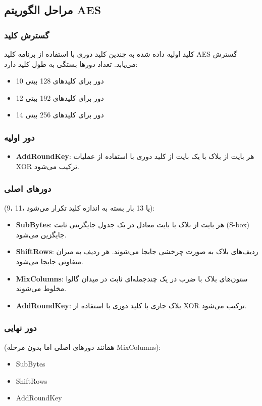 \documentclass[11pt]{article}
\begin{document}
\subsection*{مراحل الگوریتم AES}

\subsubsection*{گسترش کلید}
کلید اولیه داده شده به چندین کلید دوری با استفاده از برنامه کلید AES گسترش می‌یابد. تعداد دورها بستگی به طول کلید دارد:
\begin{itemize}
    \item 10 دور برای کلیدهای 128 بیتی
    \item 12 دور برای کلیدهای 192 بیتی
    \item 14 دور برای کلیدهای 256 بیتی
\end{itemize}

\subsubsection*{دور اولیه}
\begin{itemize}
    \item \textbf{AddRoundKey}: هر بایت از بلاک با یک بایت از کلید دوری با استفاده از عملیات XOR ترکیب می‌شود.
\end{itemize}

\subsubsection*{دورهای اصلی}
(9، 11، یا 13 بار بسته به اندازه کلید تکرار می‌شود):
\begin{itemize}
    \item \textbf{SubBytes}: هر بایت از بلاک با بایت معادل در یک جدول جایگزینی ثابت (S-box) جایگزین می‌شود.
    \item \textbf{ShiftRows}: ردیف‌های بلاک به صورت چرخشی جابجا می‌شوند. هر ردیف به میزان متفاوتی جابجا می‌شود.
    \item \textbf{MixColumns}: ستون‌های بلاک با ضرب در یک چندجمله‌ای ثابت در میدان گالوا مخلوط می‌شوند.
    \item \textbf{AddRoundKey}: بلاک جاری با کلید دوری با استفاده از XOR ترکیب می‌شود.
\end{itemize}

\subsubsection*{دور نهایی}
(همانند دورهای اصلی اما بدون مرحله MixColumns):
\begin{itemize}
    \item SubBytes
    \item ShiftRows
    \item AddRoundKey
\end{itemize}
\end{document}
